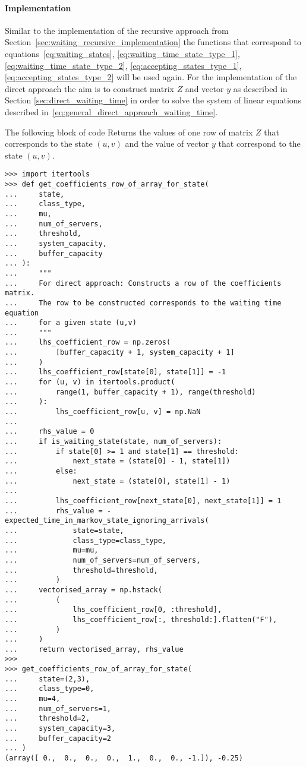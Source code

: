 \paragraph{Implementation}\label{sec:waiting_direct_implementation}

Similar to the implementation of the recursive approach from
Section~\ref{sec:waiting_recursive_implementation} the functions that correspond
to equations~\eqref{eq:waiting_states}, \eqref{eq:waiting_time_state_type_1},
\eqref{eq:waiting_time_state_type_2}, \eqref{eq:accepting_states_type_1},
\eqref{eq:accepting_states_type_2} will be used again.
For the implementation of the direct approach the aim is to construct matrix
\(Z\) and vector \(y\) as described in Section
\ref{sec:direct_waiting_time} in order to solve the system of linear
equations described in~\eqref{eq:general_direct_approach_waiting_time}.

The following block of code Returns the values of one row of matrix \(Z\) that
corresponds to the state \((u,v)\) and the value of vector \(y\) that
correspond to the state \((u,v)\).

\begin{lstlisting}[style=pystyle]
>>> import itertools
>>> def get_coefficients_row_of_array_for_state(
...     state,
...     class_type,
...     mu,
...     num_of_servers,
...     threshold,
...     system_capacity,
...     buffer_capacity
... ):
...     """
...     For direct approach: Constructs a row of the coefficients matrix.
...     The row to be constructed corresponds to the waiting time equation
...     for a given state (u,v)
...     """
...     lhs_coefficient_row = np.zeros(
...         [buffer_capacity + 1, system_capacity + 1]
...     )
...     lhs_coefficient_row[state[0], state[1]] = -1
...     for (u, v) in itertools.product(
...         range(1, buffer_capacity + 1), range(threshold)
...     ):
...         lhs_coefficient_row[u, v] = np.NaN
... 
...     rhs_value = 0
...     if is_waiting_state(state, num_of_servers):
...         if state[0] >= 1 and state[1] == threshold:
...             next_state = (state[0] - 1, state[1])
...         else:
...             next_state = (state[0], state[1] - 1)
... 
...         lhs_coefficient_row[next_state[0], next_state[1]] = 1
...         rhs_value = -expected_time_in_markov_state_ignoring_arrivals(
...             state=state,
...             class_type=class_type,
...             mu=mu,
...             num_of_servers=num_of_servers,
...             threshold=threshold,
...         )
...     vectorised_array = np.hstack(
...         (
...             lhs_coefficient_row[0, :threshold],
...             lhs_coefficient_row[:, threshold:].flatten("F"),
...         )
...     )
...     return vectorised_array, rhs_value
>>>
>>> get_coefficients_row_of_array_for_state(
...     state=(2,3),
...     class_type=0,
...     mu=4,
...     num_of_servers=1,
...     threshold=2,
...     system_capacity=3,
...     buffer_capacity=2
... )
(array([ 0.,  0.,  0.,  0.,  1.,  0.,  0., -1.]), -0.25)

\end{lstlisting}

